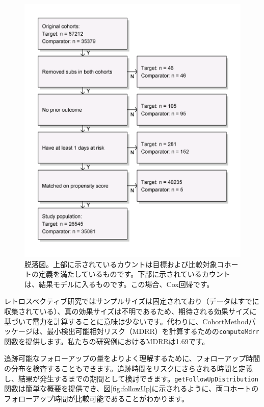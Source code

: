 \documentclass[
  11pt]{book}
\theoremstyle{definition}
\theoremstyle{definition}
\theoremstyle{definition}
\theoremstyle{definition}
\theoremstyle{remark}
\begin{document}
\begin{figure}

{\centering \includegraphics[width=0.7\linewidth]{images/PopulationLevelEstimation/attrition} 

}

\caption{脱落図。上部に示されているカウントは目標および比較対象コホートの定義を満たしているものです。下部に示されているカウントは、結果モデルに入るものです。この場合、Cox回帰です。}\label{fig:attrition}
\end{figure}

レトロスペクティブ研究ではサンプルサイズは固定されており（データはすでに収集されている）、真の効果サイズは不明であるため、期待される効果サイズに基づいて電力を計算することに意味は少ないです。代わりに、CohortMethodパッケージは、最小検出可能相対リスク（MDRR）を計算するための\texttt{computeMdrr}関数を提供します。私たちの研究例におけるMDRRは1.69です。  

追跡可能なフォローアップの量をよりよく理解するために、フォローアップ時間の分布を検査することもできます。追跡時間をリスクにさらされる時間と定義し、結果が発生するまでの期間として検討できます。\texttt{getFollowUpDistribution}関数は簡単な概要を提供でき、図\ref{fig:followUp}に示されるように、両コホートのフォローアップ時間が比較可能であることがわかります。
\end{document}
